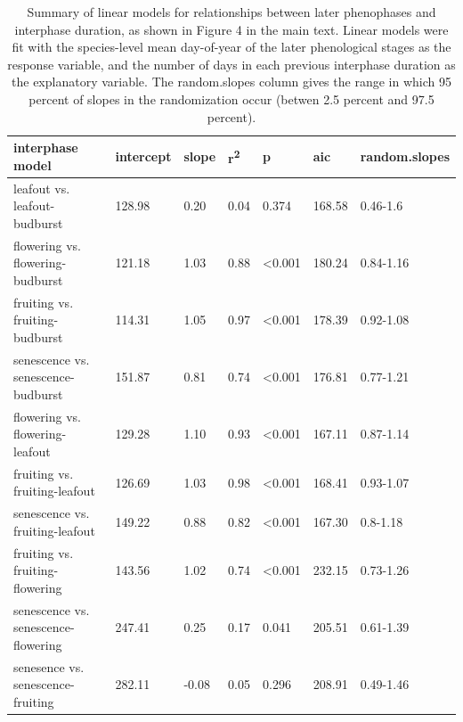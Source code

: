 \documentclass{article}
\begin{document}
\begin{table}[ht]
\centering
\caption{Summary of linear models for relationships between later phenophases and interphase duration, as shown in Figure 4 in the main text. Linear models were fit with the species-level mean day-of-year of the later phenological stages as the response variable, and the number of days in each previous interphase duration as the explanatory variable. The random.slopes column gives the range in which 95 percent of slopes in the randomization occur (betwen 2.5 percent and 97.5 percent).} 
\label{table:interphase}
\begin{tabular}{|p{}|p{}|p{}|p{}|p{}|p{}|p{}|}
  \hline
interphase model & intercept & slope & r\textsuperscript{2} & p & aic & random.slopes \\ 
  \hline
leafout vs. leafout-budburst & 128.98 & 0.20 & 0.04 & 0.374 & 168.58 & 0.46-1.6 \\ 
  flowering vs. flowering-budburst & 121.18 & 1.03 & 0.88 & <0.001 & 180.24 & 0.84-1.16 \\ 
  fruiting vs. fruiting-budburst & 114.31 & 1.05 & 0.97 & <0.001 & 178.39 & 0.92-1.08 \\ 
  senescence vs. senescence-budburst & 151.87 & 0.81 & 0.74 & <0.001 & 176.81 & 0.77-1.21 \\ 
  flowering vs. flowering-leafout & 129.28 & 1.10 & 0.93 & <0.001 & 167.11 & 0.87-1.14 \\ 
  fruiting vs. fruiting-leafout & 126.69 & 1.03 & 0.98 & <0.001 & 168.41 & 0.93-1.07 \\ 
  senescence vs. fruiting-leafout & 149.22 & 0.88 & 0.82 & <0.001 & 167.30 & 0.8-1.18 \\ 
  fruiting vs. fruiting-flowering & 143.56 & 1.02 & 0.74 & <0.001 & 232.15 & 0.73-1.26 \\ 
  senescence vs. senescence-flowering & 247.41 & 0.25 & 0.17 & 0.041 & 205.51 & 0.61-1.39 \\ 
  senesence vs. senescence-fruiting & 282.11 & -0.08 & 0.05 & 0.296 & 208.91 & 0.49-1.46 \\ 
   \hline
\end{tabular}
\end{table}
\end{document}
